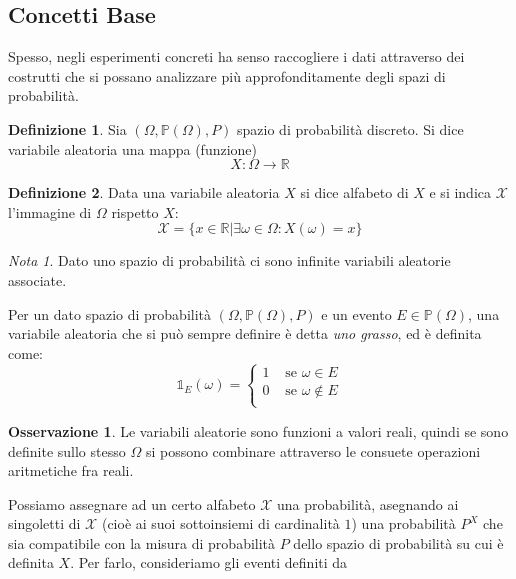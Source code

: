 \documentclass{article}
\theoremstyle{plain}
\theoremstyle{definition}
\newtheorem{definizione}{Definizione}[section]
\newtheorem{osservazione}{Osservazione}[section]
\theoremstyle{remark}
\newtheorem*{nota}{Nota}
\begin{document}
\subsection{Concetti Base} %
\label{sub:concetti_base}
Spesso, negli esperimenti concreti ha senso raccogliere i dati attraverso dei costrutti che si possano analizzare più approfonditamente degli spazi di probabilità.
\begin{definizione}
	Sia $(\Omega, \mathds{P}(\Omega), P)$ spazio di probabilità discreto. Si dice variabile aleatoria una mappa (funzione)
	\begin{equation*}
		X\colon \Omega\to\mathds{R}
	\end{equation*}
\end{definizione}
\begin{definizione}
	Data una variabile aleatoria $X$ si dice alfabeto di $X$ e si indica $\mathcal{X}$ l'immagine di $\Omega$ rispetto $X$:
	\begin{equation*}
		\mathcal{X}=\{x\in\mathds{R}\vert \exists \omega\in\Omega\colon X(\omega)=x\}
	\end{equation*}
\end{definizione}
\begin{nota}
	Dato uno spazio di probabilità ci sono infinite variabili aleatorie associate.
\end{nota}
Per un dato spazio di probabilità $(\Omega, \mathds{P}(\Omega), P)$ e un evento $E\in\mathds{P}(\Omega)$, una variabile aleatoria che si può sempre definire è detta \textit{uno grasso}, ed è definita come:
\begin{equation*}
	\mathds{1}_E(\omega)=
	\begin{cases}
		1&\text{ se }\omega\in E\\
		0&\text{ se }\omega\notin E\\
	\end{cases}
\end{equation*}
\begin{osservazione}
	Le variabili aleatorie sono funzioni a valori reali, quindi se sono definite sullo stesso $\Omega$ si possono combinare attraverso le consuete operazioni aritmetiche fra reali.
\end{osservazione}
Possiamo assegnare ad un certo alfabeto $\mathcal{X}$ una probabilità, asegnando ai singoletti di $\mathcal{X}$ (cioè ai suoi sottoinsiemi di cardinalità $1$) una probabilità $P^X$ che sia compatibile con la misura di probabilità $P$ dello spazio di probabilità su cui è definita $X$. Per farlo, consideriamo gli eventi definiti da
\end{document}
